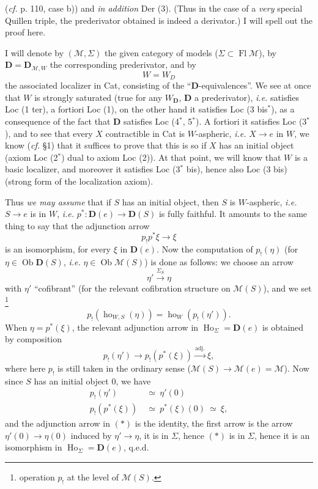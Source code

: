 \documentclass[11pt]{article}
\newcommand{\printedpage}[1]{\marginpar{\footnotesize p.~#1}}
\newcommand{\msp}[1]{\marginpar{\footnotesize [#1]}}
\begin{document}
\printedpage{54}
\msp{page 114}
(\textit{cf.} p. 110, case b)) and \textit{in addition} Der (3). (Thus in the case of a \textit{very} special Quillen triple, the prederivator obtained is indeed a derivator.) I will spell out the proof here.

I will denote by $(\mathcal{M},\Sigma)$ the given category of models ($\Sigma\subset\operatorname{Fl}\mathcal{M}$), by $\mathbf{D}=\mathbf{D}_{\mathcal{M},W}$ the corresponding prederivator, and by
\[ W=W_D \] %
the associated localizer in Cat, consisting of the ``$\mathbf{D}$-equivalences''. We see at once that $W$ is strongly saturated (true for any $W_{\mathbf{D}}$, $\mathbf{D}$ a prederivator), \textit{i.e.} satisfies Loc (1 ter), a fortiori Loc (1), on the other hand it satisfies Loc (3 bis$^*$), as a consequence of the fact that $\mathbf{D}$ satisfies Loc (4$^*$, 5$^*$). A fortiori it satisfies Loc (3$^*$), and to see that every $X$ contractible in Cat is $W$-aspheric, \textit{i.e.} $X\longrightarrow e$ in $W$, we know (\textit{cf.} §1)
\msp{page 115}
that it suffices to prove that this is so if $X$ has an initial object (axiom Loc (2$^*$) dual to axiom Loc (2)). At that point, we will know that $W$ is a basic localizer, and moreover it satisfies Loc (3$^*$ bis), hence also Loc (3 bis) (strong form of the localization axiom).

Thus \textit{we may assume} that if $S$ has an initial object, then $S$ is $W$-aspheric, \textit{i.e.} $S\longrightarrow e$ is in $W$, \textit{i.e.} $p^*:\mathbf{D}(e)\longrightarrow\mathbf{D}(S)$ is fully faithful. It amounts to the same thing to say that the adjunction arrow
\[ p_!p^*\xi\longrightarrow\xi \]
is an isomorphism, for every $\xi$ in $\mathbf{D}(e)$. Now the computation of $p_!(\eta)$ (for $\eta\in\operatorname{Ob}\mathbf{D}(S)$, \textit{i.e.} $\eta\in\operatorname{Ob}\mathcal{M}(S)$) is done as follows: we choose an arrow
\[ \eta'\xrightarrow{\Sigma_S}\eta \]
with $\eta'$ ``cofibrant'' (for the relevant cofibration structure on $\mathcal{M}(S)$), and we
\msp{page 116}
set \footnote[54]{operation $p_!$ at the level of $\mathcal{M}(S)$.}
\[ p_!(\operatorname{ho}_{W,S}(\eta))=\operatorname{ho}_W(p_!(\eta')). \]
When $\eta=p^*(\xi)$, the relevant adjunction arrow in $\operatorname{Ho}_\Sigma=\mathbf{D}(e)$ is obtained by composition
\[ p_!(\eta')\longrightarrow p_!(p^*(\xi))\xrightarrow{\text{adj.}}\xi, \tag*{$(*)$} \]
where here $p_!$ is still taken in the ordinary sense ($\mathcal{M}(S)\longrightarrow\mathcal{M}(e)=\mathcal{M}$). Now since $S$ has an initial object 0, we have
\[ \begin{aligned}
p_!(\eta') &\ \simeq\ \eta'(0)\\
p_!(p^*(\xi)) &\ \simeq\ p^*(\xi)(0)\ \simeq\ \xi,
\end{aligned} \]
and the adjunction arrow in $(*)$ is the identity, the first arrow is the arrow $\eta'(0)\longrightarrow\eta(0)$ induced by $\eta'\longrightarrow\eta$, it is in $\Sigma$, hence $(*)$ is in $\Sigma$, hence it is an isomorphism in $\operatorname{Ho}_\Sigma=\mathbf{D}(e)$, q.e.d.
\end{document}
